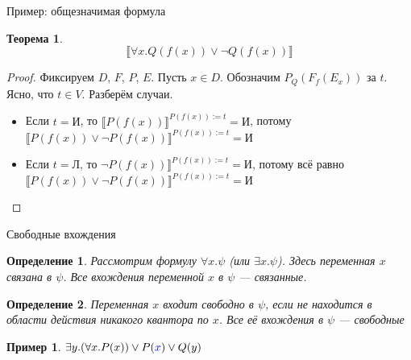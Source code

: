 \documentclass[aspectratio=169]{beamer}
\newtheorem{thm}{Теорема}[section]
\newtheorem{dfn}{Определение}[section]
\newtheorem{exm}{Пример}[section]
\begin{document}
\begin{frame}{Пример: общезначимая формула}
\begin{thm}$$\llbracket\forall x.Q(f(x))\vee\neg Q(f(x))\rrbracket$$\end{thm}

\begin{proof}
Фиксируем $D$, $F$, $P$, $E$. \pause Пусть $x \in D$. \pause
Обозначим $P_{Q}(F_{f}(E_x))$ за $t$. \pause
Ясно, что $t \in V$. Разберём случаи.
\begin{itemize}
\item Если $t = \text{И}$, то $\llbracket P(f(x))\rrbracket^{P(f(x)):=t} = \text{И}$,
  потому $\llbracket P(f(x))\vee\neg P(f(x))\rrbracket^{P(f(x)):=t} = \text{И}$
\item Если $t = \text{Л}$, то $\neg P(f(x))\rrbracket^{P(f(x)):=t} = \text{И}$, потому
  всё равно $\llbracket P(f(x))\vee\neg P(f(x))\rrbracket^{P(f(x)):=t} = \text{И}$
\end{itemize}
\end{proof}
\end{frame}

\begin{frame}{Свободные вхождения}
\begin{dfn}Рассмотрим формулу $\forall x.\psi$ (или $\exists x.\psi$). Здесь переменная $x$ связана в $\psi$.
Все вхождения переменной $x$ в $\psi$ --- связанные.\end{dfn}
\begin{dfn}Переменная $x$ входит свободно в $\psi$, если не находится в области действия никакого квантора по $x$.
Все её вхождения в $\psi$ --- свободные\end{dfn}

\begin{exm}$\exists y.(\forall x.P(x))\vee P({\color{blue}x}) \vee Q(y)$\end{exm}
\end{frame}
\end{document}
